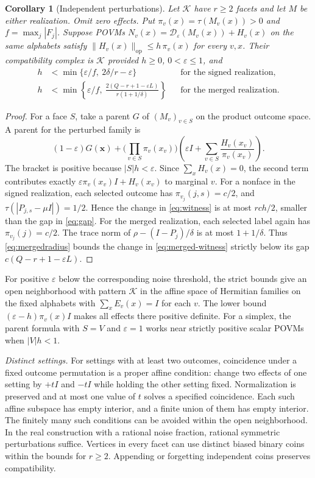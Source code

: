 \documentclass[11pt,a4paper]{article}
\newtheorem{corollary}[theorem]{Corollary}
\theoremstyle{definition}
\newcommand{\Id}{I}
\newcommand{\op}{\mathrm{op}}
\newcommand{\K}{\mathcal K}
\newcommand{\D}{\mathcal D}
\begin{document}
\begin{corollary}[Independent perturbations]\label{cor:perturb}
Let \(\K\) have \(r\ge2\) facets and let \(M\) be either realization.
Omit zero effects. Put \(\pi_v(x)=\tau(M_v(x))>0\) and \(f=\max_j|F_j|\). Suppose POVMs \(N_v(x)=\D_\varepsilon(M_v(x))+H_v(x)\)
on the same alphabets satisfy
\(\|H_v(x)\|_{\op}\le h\,\pi_v(x)\) for every \(v,x\). Their compatibility
complex is \(\K\) provided \(h\ge0\), \(0<\varepsilon\le1\), and
\begin{align}
 h&<\min\{\varepsilon/f,\ 2\delta/r-\varepsilon\}
       &&\text{for the signed realization},\label{eq:radius}\\
 h&<\min\left\{\varepsilon/f,\
        \frac{2(Q-r+1-\varepsilon L)}{r(1+1/\delta)}\right\}
       &&\text{for the merged realization}.\label{eq:mergedradius}
\end{align}
\end{corollary}
\begin{proof}
For a face \(S\), take a parent \(G\) of \((M_v)_{v\in S}\) on the
product outcome space. A parent for the perturbed family is
\[
 (1-\varepsilon)G(\boldsymbol x)
 +\Big(\prod_{v\in S}\pi_v(x_v)\Big)
   \left(\varepsilon\Id+\sum_{v\in S}\frac{H_v(x_v)}{\pi_v(x_v)}\right).
\]
The bracket is positive because \(|S|h<\varepsilon\). Since
\(\sum_x H_v(x)=0\), the second term contributes exactly
\(\varepsilon \pi_v(x_v)\Id+H_v(x_v)\) to marginal \(v\). For a nonface in the signed
realization, each selected outcome has \(\pi_{v_j}(j,s)=c/2\), and
\(\tau(|P_{j,s}-\mu\Id|)=1/2\). Hence the change in \eqref{eq:witness}
is at most \(rch/2\), smaller than the gap in \eqref{eq:gap}.
For the merged realization, each selected label again has \(\pi_{v_j}(j)=c/2\).
The trace norm of \(\rho-(\Id-P_j)/\delta\) is at most \(1+1/\delta\).
Thus \eqref{eq:mergedradius} bounds the change in \eqref{eq:merged-witness}
strictly below its gap \(c(Q-r+1-\varepsilon L)\).
\end{proof}

For positive \(\varepsilon\) below the corresponding noise threshold, the
strict bounds give an open neighborhood with pattern \(\K\) in the affine space
of Hermitian families on the fixed alphabets with \(\sum_x E_v(x)=\Id\)
for each \(v\). The lower bound \((\varepsilon-h)\pi_v(x)\Id\) makes all
effects there positive definite. For a simplex, the parent formula with
\(S=V\) and \(\varepsilon=1\) works near strictly positive scalar POVMs when
\(|V|h<1\).

\emph{Distinct settings.} For settings with at least two outcomes, coincidence under a fixed outcome
permutation is a proper affine condition: change two effects of one setting by \(+t\Id\) and \(-t\Id\) while holding the other setting fixed. Normalization is preserved and at most one value of \(t\) solves a specified coincidence. Each such affine subspace has empty interior, and a finite union of them has empty interior. The finitely many such conditions
can be avoided within the open neighborhood. In the real construction with
a rational noise fraction, rational symmetric perturbations suffice.
Vertices in every facet can use distinct biased binary coins within the
bounds for \(r\ge2\). Appending or forgetting independent coins preserves
compatibility.
\end{document}
